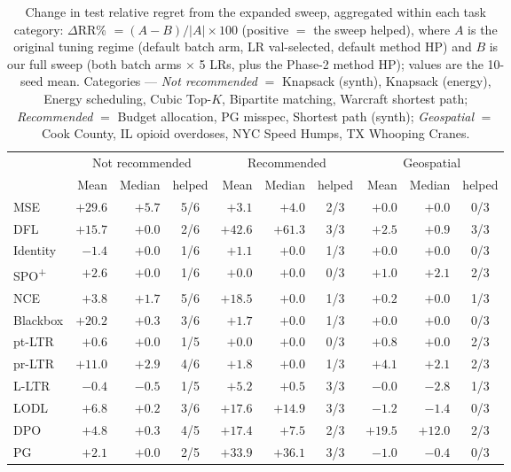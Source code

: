 \begin{table}[t]
\centering
\caption{Change in test relative regret from the expanded sweep, aggregated within each task category: $\Delta$RR\% $=(A-B)/|A|\times100$ (positive $=$ the sweep helped), where $A$ is the original tuning regime (default batch arm, LR val-selected, default method HP) and $B$ is our full sweep (both batch arms $\times$ 5 LRs, plus the Phase-2 method HP); values are the 10-seed mean. Categories --- \emph{Not recommended} $=$ Knapsack (synth), Knapsack (energy), Energy scheduling, Cubic Top-$K$, Bipartite matching, Warcraft shortest path; \emph{Recommended} $=$ Budget allocation, PG misspec, Shortest path (synth); \emph{Geospatial} $=$ Cook County, IL opioid overdoses, NYC Speed Humps, TX Whooping Cranes.}
\label{tab:notrec-rec-geo-spw-regret-change-by-group-mean-paper}
\setlength{\tabcolsep}{5pt}
\renewcommand{\arraystretch}{1.1}
\begin{tabular}{@{}lrrcrrcrrc@{}}
\toprule
 & \multicolumn{3}{c}{Not recommended} & \multicolumn{3}{c}{Recommended} & \multicolumn{3}{c}{Geospatial} \\
\cmidrule(lr){2-4}\cmidrule(lr){5-7}\cmidrule(lr){8-10}
 & Mean & Median & helped & Mean & Median & helped & Mean & Median & helped \\
\midrule
MSE & \cellcolor{green!28}$+29.6$ & \cellcolor{green!18}$+5.7$ & 5/6 & $+3.1$ & $+4.0$ & 2/3 & $+0.0$ & $+0.0$ & 0/3 \\
DFL & \cellcolor{green!18}$+15.7$ & $+0.0$ & 2/6 & \cellcolor{green!28}$+42.6$ & \cellcolor{green!28}$+61.3$ & 3/3 & $+2.5$ & $+0.9$ & 3/3 \\
Identity & $-1.4$ & $+0.0$ & 1/6 & $+1.1$ & $+0.0$ & 1/3 & $+0.0$ & $+0.0$ & 0/3 \\
SPO\textsuperscript{+} & $+2.6$ & $+0.0$ & 1/6 & $+0.0$ & $+0.0$ & 0/3 & $+1.0$ & $+2.1$ & 2/3 \\
NCE & $+3.8$ & $+1.7$ & 5/6 & \cellcolor{green!18}$+18.5$ & $+0.0$ & 1/3 & $+0.2$ & $+0.0$ & 1/3 \\
Blackbox & \cellcolor{green!18}$+20.2$ & $+0.3$ & 3/6 & $+1.7$ & $+0.0$ & 1/3 & $+0.0$ & $+0.0$ & 0/3 \\
pt-LTR & $+0.6$ & $+0.0$ & 1/5 & $+0.0$ & $+0.0$ & 0/3 & $+0.8$ & $+0.0$ & 2/3 \\
pr-LTR & \cellcolor{green!18}$+11.0$ & $+2.9$ & 4/6 & $+1.8$ & $+0.0$ & 1/3 & $+4.1$ & $+2.1$ & 2/3 \\
L-LTR & $-0.4$ & $-0.5$ & 1/5 & \cellcolor{green!18}$+5.2$ & $+0.5$ & 3/3 & $-0.0$ & $-2.8$ & 1/3 \\
LODL & \cellcolor{green!18}$+6.8$ & $+0.2$ & 3/6 & \cellcolor{green!18}$+17.6$ & \cellcolor{green!18}$+14.9$ & 3/3 & $-1.2$ & $-1.4$ & 0/3 \\
DPO & $+4.8$ & $+0.3$ & 4/5 & \cellcolor{green!18}$+17.4$ & \cellcolor{green!18}$+7.5$ & 2/3 & \cellcolor{green!18}$+19.5$ & \cellcolor{green!18}$+12.0$ & 2/3 \\
PG & $+2.1$ & $+0.0$ & 2/5 & \cellcolor{green!28}$+33.9$ & \cellcolor{green!28}$+36.1$ & 3/3 & $-1.0$ & $-0.4$ & 0/3 \\
\bottomrule
\end{tabular}
\end{table}
